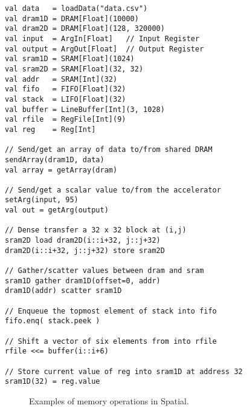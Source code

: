 \newsavebox{\firstlisting}
\begin{lrbox}{\firstlisting}
\begin{lstlisting}[language=Spatial,linewidth=0.6\textwidth]
val data   = loadData("data.csv")
val dram1D = DRAM[Float](10000)
val dram2D = DRAM[Float](128, 320000)
val input  = ArgIn[Float]   // Input Register
val output = ArgOut[Float]  // Output Register
val sram1D = SRAM[Float](1024)
val sram2D = SRAM[Float](32, 32)
val addr   = SRAM[Int](32)
val fifo   = FIFO[Float](32)
val stack  = LIFO[Float](32)
val buffer = LineBuffer[Int](3, 1028)
val rfile  = RegFile[Int](9)
val reg    = Reg[Int]

// Send/get an array of data to/from shared DRAM
sendArray(dram1D, data)
val array = getArray(dram)

// Send/get a scalar value to/from the accelerator
setArg(input, 95)
val out = getArg(output)

// Dense transfer a 32 x 32 block at (i,j)
sram2D load dram2D(i::i+32, j::j+32)
dram2D(i::i+32, j::j+32) store sram2D

// Gather/scatter values between dram and sram
sram1D gather dram1D(offset=0, addr)
dram1D(addr) scatter sram1D

// Enqueue the topmost element of stack into fifo
fifo.enq( stack.peek )

// Shift a vector of six elements from into rfile
rfile <<= buffer(i::i+6)

// Store current value of reg into sram1D at address 32
sram1D(32) = reg.value
\end{lstlisting}
\end{lrbox}

\begin{figure*}
\centering
\usebox{\firstlisting}
\caption{Examples of memory operations in Spatial.
}
\label{f:memexamples}
\end{figure*}
